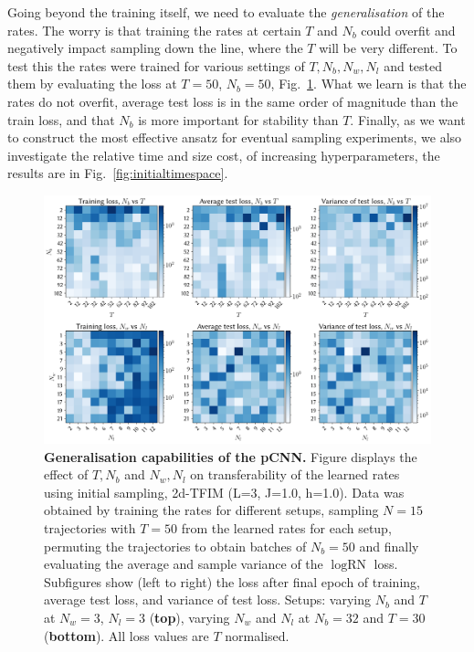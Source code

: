 Going beyond the training itself, we need to evaluate the \emph{generalisation} of the rates. The worry is that training the rates at certain $T$ and $N_b$ could overfit and negatively impact sampling down the line, where the $T$ will be very different. To test this the rates were trained for various settings of $T, N_b, N_w, N_l$ and tested them by evaluating the loss at $T=50$, $N_b=50$, Fig.~\ref{fig:avgvarloss}. What we learn is that the rates do not overfit, average test loss is in the same order of magnitude than the train loss, and that $N_b$ is more important for stability than $T$. Finally, as we want to construct the most effective ansatz for eventual sampling experiments, we also investigate the relative time and size cost, of increasing hyperparameters, the results are in Fig.~\ref{fig:initialtimespace}.

\begin{figure}[H]
	\centering
	\includegraphics[width=\linewidth]{Chapter5/Figs/Raster/avg_var_loss}
	\caption[Generalisation capabilities of the pCNN]{\textbf{Generalisation capabilities of the pCNN.} Figure displays the effect of $T, N_b$ and $N_w, N_l$ on transferability of the learned rates using initial sampling, 2d-TFIM (L=3, J=1.0, h=1.0). Data was obtained by training the rates for different setups, sampling $N=15$ trajectories with $T=50$ from the learned rates for each setup, permuting the trajectories to obtain batches of $N_b=50$ and finally evaluating the average and sample variance of the $\log \text{RN}$ loss. Subfigures show (left to right) the loss after final epoch of training, average test loss, and variance of test loss. Setups: varying $N_b$ and $T$ at $N_w=3$, $N_l=3$ (\textbf{top}), varying $N_w$ and $N_l$ at $N_b=32$ and $T=30$ (\textbf{bottom}). All loss values are $T$ normalised.}
	\label{fig:avgvarloss}
\end{figure}

